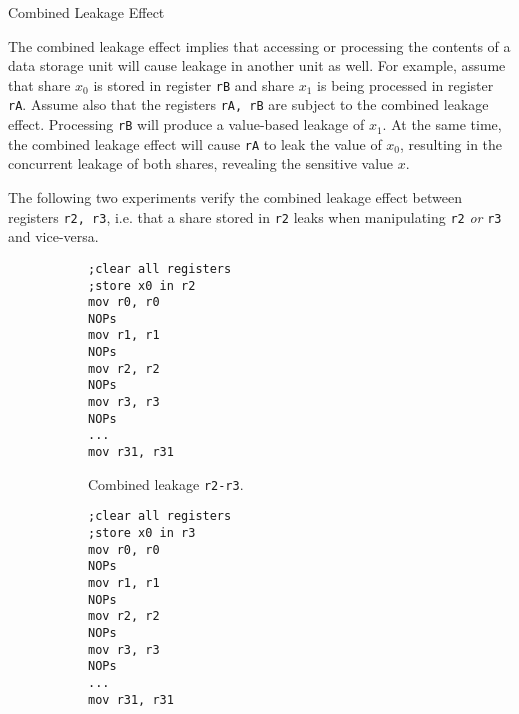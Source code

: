 \begin{subsection}{Combined Leakage Effect}\label{combined_leakage}

The combined leakage effect implies that accessing or processing the contents of a data storage unit will cause leakage in another unit as well. For example, assume that share $x_0$ is stored in register \texttt{rB} and share $x_1$ is being processed in register \texttt{rA}. Assume also that the registers \texttt{rA, rB} are subject to the combined leakage effect. Processing \texttt{rB} will produce a value-based leakage of $x_1$. At the same time, the combined leakage effect will cause \texttt{rA} to leak the value of $x_0$, resulting in the concurrent leakage of both shares, revealing the sensitive value $x$.

The following two experiments verify the combined leakage effect between registers \texttt{r2, r3}, i.e. that a share stored in \texttt{r2} leaks when manipulating \texttt{r2} \emph{or} \texttt{r3} and vice-versa.
\begin{figure}[H]
    \centering
\begin{subfigure}[b]{0.4\textwidth}
\texttt{;clear all registers\\
;store x0 in r2 \\
mov r0, r0\\
NOPs \\
mov r1, r1\\
NOPs \\
mov r2, r2\\
NOPs \\
mov r3, r3 \\
NOPs \\
...\\
mov r31, r31 }

        \caption{\scriptsize{Combined leakage \texttt{r2-r3}.}}

    \end{subfigure}
\begin{subfigure}[b]{0.4\textwidth}
\texttt{;clear all registers\\
;store x0 in r3 \\
mov r0, r0\\
NOPs \\
mov r1, r1\\
NOPs \\
mov r2, r2\\
NOPs \\
mov r3, r3 \\
NOPs \\
...\\
mov r31, r31 }


\end{subfigure}
\end{figure}
\end{subsection}
